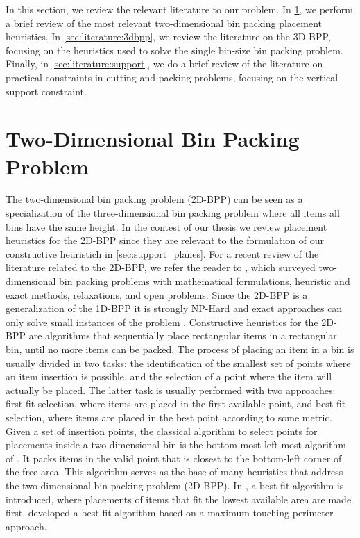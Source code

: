 In this section, we review the relevant literature to our problem. 
In \cref{sec:literature:2dbpp}, we perform a brief review of the most relevant two-dimensional bin packing placement heuristics.
In \cref{sec:literature:3dbpp}, we review the literature on the 3D-BPP, focusing on the heuristics used to solve the single bin-size bin packing problem.
Finally, in \cref{sec:literature:support}, we do a brief review of the literature on practical constraints in cutting and packing problems, focusing on the vertical support constraint.

\section{Two-Dimensional Bin Packing Problem}
\label{sec:literature:2dbpp}%

The two-dimensional bin packing problem (2D-BPP) can be seen as a specialization of the three-dimensional bin packing problem where all items all bins have the same height.
In the contest of our thesis we review placement heuristics for the 2D-BPP since they are relevant to the formulation of our constructive heuristich in \cref{sec:support_planes}.
For a recent review of the literature related to the 2D-BPP, we refer the reader to \cite{IORI2021399}, which surveyed two-dimensional bin packing problems with mathematical formulations, heuristic and exact methods, relaxations, and open problems.
Since the 2D-BPP is a generalization of the 1D-BPP it is strongly NP-Hard and exact approaches can only solve small instances of the problem \cite{martello2000three}.
Constructive heuristics for the 2D-BPP are algorithms that sequentially place rectangular items in a rectangular bin, until no more items can be packed.
The process of placing an item in a bin is usually divided in two tasks: the identification of the smallest set of points where an item insertion is possible, and the selection of a point where the item will actually be placed. 
The latter task is usually performed with two approaches: first-fit selection, where items are placed in the first available point, and best-fit selection, where items are placed in the best point according to some metric. 
Given a set of insertion points, the classical algorithm to select points for placements inside a two-dimensional bin is the bottom-most left-most algorithm of \cite{Baker1980}. 
It packs items in the valid point that is closest to the bottom-left corner of the free area. This algorithm serves as the base of many heuristics that address the two-dimensional bin packing problem (2D-BPP).
In \cite{burke2004new}, a best-fit algorithm is introduced, where placements of items that fit the lowest available area are made first.
\cite{lodi1999heuristic} developed a best-fit algorithm based on a maximum touching perimeter approach.

